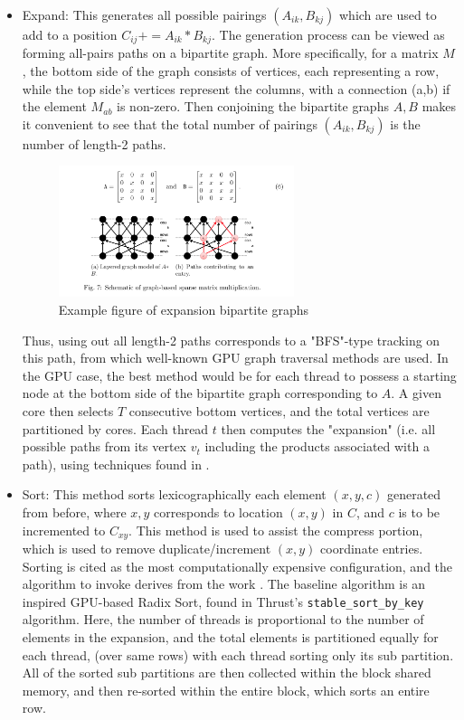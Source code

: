 \documentclass[12pt]{article}
\def\code#1{\texttt{#1}}
\begin{document}
\begin{itemize}
\item Expand: This generates all possible pairings $(A_{ik}, B_{kj})$ which are used to add to a position $C_{ij} += A_{ik}*B_{kj}$. The generation process can be viewed as forming all-pairs paths on a bipartite graph. More specifically, for a matrix $M$, the bottom side of the graph consists of vertices, each representing a row, while the top side's vertices represent the columns, with a connection (a,b) if the element $M_{ab}$ is non-zero. Then conjoining the bipartite graphs $A,B$ makes it convenient to see that the total number of pairings $(A_{ik}, B_{kj})$ is the number of length-2 paths. 

\begin{figure}[h]
  \caption{Example figure of expansion bipartite graphs}
  \centering 
  \includegraphics[width = 0.65\textwidth]{bipartite_MM.png}
\end{figure}
Thus, using out all length-2 paths corresponds to a "BFS"-type tracking on this path, from which well-known GPU graph traversal methods are used. In the GPU case, the best method would be for each thread to possess a starting node at the bottom side of the bipartite graph corresponding to $A$. A given core then selects $T$ consecutive bottom vertices, and the total vertices are partitioned by cores. Each thread $t$ then computes the "expansion" (i.e. all possible paths from its vertex $v_{t}$ including the products associated with a path), using techniques found in \cite{bfs_gpu}. 
\item Sort: This method sorts lexicographically each element $(x,y, c)$ generated from before, where $x,y$ corresponds to location $(x,y)$ in $C$, and $c$ is to be incremented to $C_{xy}$. This method is used to assist the compress portion, which is used to remove duplicate/increment $(x,y)$ coordinate entries. Sorting is cited as the most computationally expensive configuration, and the algorithm to invoke derives from the work \cite{sort}. The baseline algorithm is an inspired GPU-based Radix Sort, found in Thrust's \code{stable\_sort\_by\_key} algorithm. Here, the number of threads is proportional to the number of elements in the expansion, and the total elements is partitioned equally for each thread, (over same rows) with each thread sorting only its sub partition. All of the sorted sub partitions are then collected within the block shared memory, and then re-sorted within the entire block, which sorts an entire row.  




\end{itemize}
\end{document}
